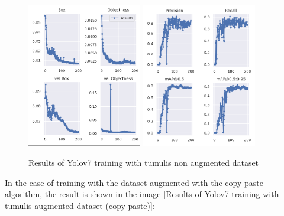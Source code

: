 \begin{figure}[H]
    \centering
    {{\includegraphics[width=5cm]{images/training/mamoas/notaug1.png} }}
    \qquad
    {{\includegraphics[width=5cm]{images/training/mamoas/notaug2.png} }}
    \caption{Results of Yolov7 training with tumulis non augmented dataset}
    \label{Results of Yolov7 training with tumulis non augmented dataset}
\end{figure}

In the case of training with the dataset augmented with the copy paste algorithm, the result is shown in the image \ref{Results of Yolov7 training with tumulis augmented dataset (copy paste)}:

